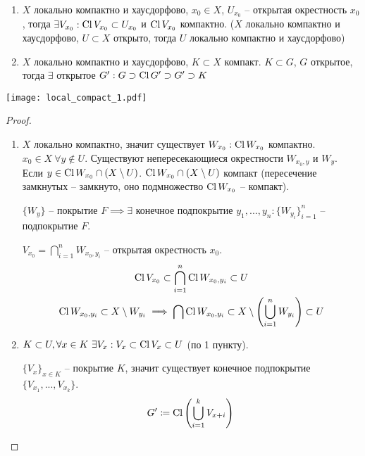 \documentclass[main]{subfiles}
\begin{document}
\begin{theorem}
    \

    \begin{enumerate}
        \item $X$ локально компактно и хаусдорфово, $x_0 \in X$, $U_{x_0}$ -- открытая окрестность $x_0$,
              тогда $\exists V_{x_0}: \operatorname{Cl} V_{x_0} \subset U_{x_0}$ и $\operatorname{Cl} V_{x_0}$ компактно.
              ($X$ локально компактно и хаусдорфово, $U \subset X$ открыто, тогда $U$ локально компактно и хаусдорфово)
        \item $X$ локально компактно и хаусдорфово, $K \subset X$ компакт.
              $K \subset G$, $G$ открытое, тогда $\exists$ открытое $G': G \supset \operatorname{Cl} G' \supset G' \supset K$
    \end{enumerate}
    \begin{center}
        \texttt{[image: local\_compact\_1.pdf]}
    \end{center}
\end{theorem}
\begin{proof}
    \

    \begin{enumerate}
        \item $X$ локально компактно, значит существует $W_{x_0}: \operatorname{Cl} W_{x_0}$ компактно.
              $x_0 \in X\ \forall y \notin U$.
              Существуют непересекающиеся окрестности $W_{x_0,y}$ и $W_y$.
              Если $y \in \operatorname{Cl} W_{x_0} \cap (X \setminus U)$.
              $\operatorname{Cl} W_{x_0} \cap (X \setminus U)$ компакт (пересечение замкнутых -- замкнуто, оно подмножество $\operatorname{Cl} W_{x_0}$ -- компакт).

              $\{W_y\}$ -- покрытие $F \implies \exists$ конечное подпокрытие $y_1, ..., y_n: \{W_{y_i}\}_{i=1}^n$ -- подпокрытие $F$.

              $V_{x_0} = \bigcap_{i=1}^n W_{x_0,y_i}$ -- открытая окрестность $x_0$.
              \begin{gather*}
                  \operatorname{Cl} V_{x_0} \subset \bigcap_{i=1}^n \operatorname{Cl} W_{x_0, y_i} \subset U\\
                  \operatorname{Cl} W_{x_0, y_i} \subset X \setminus W_{y_i} \implies \bigcap \operatorname{Cl} W_{x_0, y_i} \subset X \setminus \left(\bigcup_{i=1}^n W_{y_i}\right) \subset U
              \end{gather*}
        \item $K \subset U, \forall x \in K \ \exists V_x: V_x \subset \operatorname{Cl} V_x \subset U$ (по 1 пункту).

              $\{V_x\}_{x \in K}$ -- покрытие $K$, значит существует конечное подпокрытие $\{V_{x_1}, ..., V_{x_k}\}$.
              \[G' \coloneqq \operatorname{Cl} \left(\bigcup_{i=1}^k V_{x+i}\right) \qedhere\]
    \end{enumerate}
\end{proof}
\end{document}
